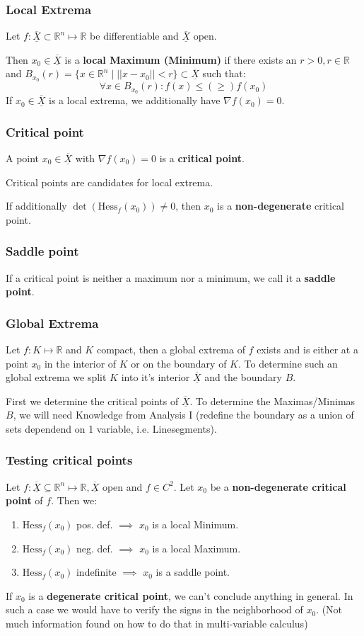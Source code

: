 \documentclass[a4paper,fontsize = 10pt]{article}
\def\R{\mathbb{R}}
\def\X{\underline{\overline{X}}}
\begin{document}
\subsubsection*{Local Extrema}
Let \(f: \X \subset \R^n \mapsto \R\) be differentiable and \(\X\) open. 

Then \(x_0 \in \X\) is a \textbf{local Maximum (Minimum)} if there exists an $r > 0, r \in \R$ and \(B_{x_0}(r) = \{x\in \R^n \mid ||x-x_0|| < r \} \subset \X\) such that:
\[\forall x \in B_{x_0}(r): f(x) \le (\ge) f(x_0)\]
If \(x_0 \in \X\) is a local extrema, we additionally have \(\nabla f(x_0) = 0\).

\subsubsection*{Critical point}
A point \(x_0 \in \X\) with \(\nabla f(x_0) = 0\) is a \textbf{critical point}. 

Critical points are candidates for local extrema.

If additionally \(\det(\text{Hess}_f(x_0)) \ne 0\), then \(x_0\) is a \textbf{non-degenerate} critical point.

\subsubsection*{Saddle point}
If a critical point is neither a maximum nor a minimum, we call it a \textbf{saddle point}.

\subsubsection*{Global Extrema}
Let \(f: K \mapsto \R\) and \(K\) compact, then a global extrema of \(f\) exists and is either at a point $x_0$ in the interior of \(K\) or on the boundary of $K$. To determine such an global extrema we split \(K\) into it's interior \(\X\) and the boundary \(B\). 

First we determine the critical points of \(\X\). To determine the Maximas/Minimas \(B\), we will need Knowledge from Analysis I (redefine the boundary as a union of sets dependend on 1 variable, i.e. Linesegments).
\subsubsection*{Testing critical points}
Let \(f: \X \subseteq \R^n \mapsto \R, \X\) open and \(f\in C^2\). Let \(x_0\) be a \textbf{non-degenerate critical point} of \(f\). Then we:
\begin{enumerate}
  \item $\text{Hess}_f(x_0)$ pos. def. \(\implies\) $x_0$ is a local Minimum.
  \item $\text{Hess}_f(x_0)$ neg. def. \(\implies\) $x_0$ is a local Maximum.
  \item $\text{Hess}_f(x_0)$ indefinite \(\implies\) $x_0$ is a saddle point.
\end{enumerate}
If \(x_0\) is a \textbf{degenerate critical point}, we can't conclude anything in general. In such a case we would have to verify the signs in the neighborhood of $x_0$. (Not much information found on how to do that in multi-variable calculus)
\end{document}
